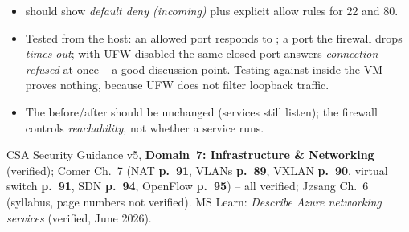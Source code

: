 \documentclass[11pt]{article}
\begin{document}
\begin{itemize}
\item {} should show \emph{default deny (incoming)} plus explicit allow rules for
      22 and 80.
\item Tested from the host: an allowed port responds to ; a port the firewall drops
      \emph{times out}; with UFW disabled the same closed port answers \emph{connection refused} at once
      -- a good discussion point. Testing against  inside the VM proves nothing, because
      UFW does not filter loopback traffic.
\item The before/after  should be unchanged (services still listen); the firewall
      controls \emph{reachability}, not whether a service runs.
\end{itemize}

CSA Security Guidance v5, \textbf{Domain~7: Infrastructure \& Networking} (verified); Comer Ch.~7
(NAT \textbf{p.~91}, VLANs \textbf{p.~89}, VXLAN \textbf{p.~90}, virtual switch \textbf{p.~91}, SDN
\textbf{p.~94}, OpenFlow \textbf{p.~95}) -- all verified; J\o sang Ch.~6 (syllabus, page numbers not
verified). MS Learn: \emph{Describe Azure networking services} (verified, June 2026).
\end{document}
